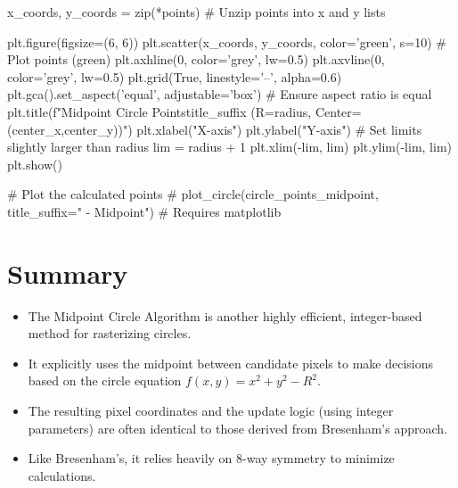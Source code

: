 \documentclass[12pt, a4paper]{article}
\begin{document}
\begin{pythoncode}
    x_coords, y_coords = zip(*points) # Unzip points into x and y lists

    plt.figure(figsize=(6, 6))
    plt.scatter(x_coords, y_coords, color='green', s=10) # Plot points (green)
    plt.axhline(0, color='grey', lw=0.5)
    plt.axvline(0, color='grey', lw=0.5)
    plt.grid(True, linestyle='--', alpha=0.6)
    plt.gca().set_aspect('equal', adjustable='box') # Ensure aspect ratio is equal
    plt.title(f"Midpoint Circle Points{title_suffix} (R={radius}, Center=({center_x},{center_y}))")
    plt.xlabel("X-axis")
    plt.ylabel("Y-axis")
    # Set limits slightly larger than radius
    lim = radius + 1
    plt.xlim(-lim, lim)
    plt.ylim(-lim, lim)
    plt.show()

# Plot the calculated points
# plot_circle(circle_points_midpoint, title_suffix=" - Midpoint") # Requires matplotlib

\end{pythoncode}

\section{Summary}
\begin{tcolorbox}[
    colback=Green!10!white,
    colframe=ForestGreen!75!black,
    title=\faCheckCircle~ Key Takeaways,
    fonttitle=\bfseries\large
    ]
    \begin{itemize}
        \item The Midpoint Circle Algorithm is another highly efficient, integer-based method for rasterizing circles.
        \item It explicitly uses the midpoint between candidate pixels to make decisions based on the circle equation $f(x,y)=x^2+y^2-R^2$.
        \item The resulting pixel coordinates and the update logic (using integer parameters) are often identical to those derived from Bresenham's approach.
        \item Like Bresenham's, it relies heavily on 8-way symmetry to minimize calculations.
    \end{itemize}
\end{tcolorbox}
\end{document}
